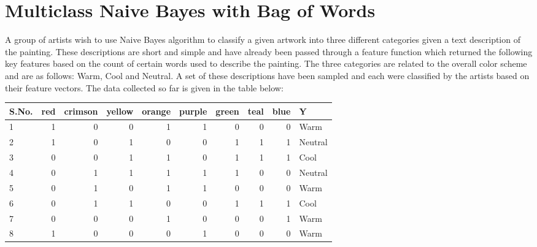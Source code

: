 \documentclass[11pt, letterpaper]{article}
\begin{document}
\newpage
\section{Multiclass Naive Bayes with Bag of Words}

    A group of artists wish to use Naive Bayes algorithm to classify a given artwork into three different categories given a text description of the painting. These descriptions are short and simple and have already been passed through a feature function which returned the following  key features based on the count of certain words used to describe the painting. The three categories are related to the overall color scheme and are as follows: Warm, Cool and Neutral. A set of these descriptions have been sampled and each were classified by the artists based on their feature vectors. The data collected so far is given in the table below:
    
    \begin{table}[h!]
    \centering
    \small
    \begin{tabular}{|l | r | r | r | r | r | r | r | r | l|}

    
    \hline
    S.No. & red & crimson & yellow & orange & purple & green & teal & blue & Y \\ \hline
    1           & 1           & 0         & 0    & 1     & 1       & 0       & 0            & 0      & Warm \\
    2           & 1           & 0         & 1    & 0     & 0       & 1       & 1            & 1      & Neutral\\
    3           & 0           & 0         & 1    & 1     & 0       & 1       & 1            & 1      & Cool\\
    4           & 0           & 1         & 1    & 1     & 1       & 1       & 0            & 0      & Neutral\\
    5           & 0           & 1         & 0    & 1     & 1       & 0       & 0            & 0      & Warm\\
    6           & 0           & 1         & 1    & 0     & 0       & 1       & 1            & 1      & Cool\\
    7           & 0           & 0         & 0    & 1     & 0       & 0       & 0            & 1      & Warm\\
    8           & 1           & 0         & 0    & 0     & 1       & 0       & 0            & 0      & Warm\\
    \hline
    \end{tabular}
    \end{table}
    
\end{document}
